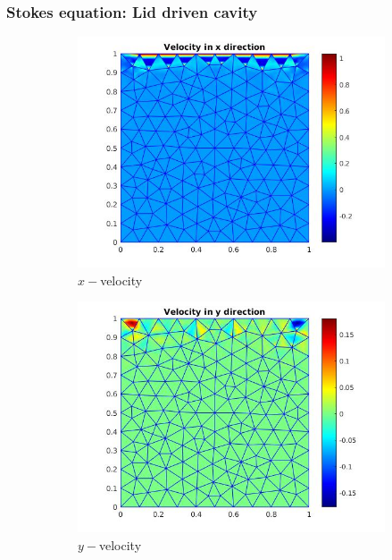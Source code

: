 \documentclass{beamer}
\begin{document}
\begin{frame}
\frametitle{Stokes equation: Lid driven cavity}
\begin{figure}
\begin{subfigure}{0.3\textwidth}	
  \includegraphics[width=\linewidth]{lid_bicgstab_vx.jpg}
  \caption{$x-$velocity} 
  \label{x_vel_stoke_bicgstab_lid}
\end{subfigure}
\begin{subfigure}{0.3\textwidth}	
  \includegraphics[width=\linewidth]{lid_bicgstab_vy.jpg}
  \caption{$y-$velocity} 
  \label{y_vel_stoke_bicgstab_lid}
\end{subfigure}
\begin{subfigure}{0.3\textwidth}	

\end{subfigure}
\end{figure}
\end{frame}
\end{document}
